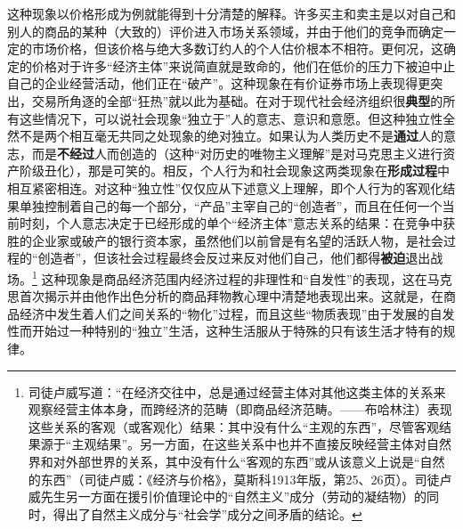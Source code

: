 \documentclass[fontset=fandol, a4paper, 12pt, openright]{ctexbook}
\begin{document}
这种现象以价格形成为例就能得到十分清楚的解释。许多买主和卖主是以对自己和别人的商品的某种（大致的）评价进入市场关系领域，并由于他们的竞争而确定一定的市场价格，但该价格与绝大多数订约人的个人估价根本不相符。更何况，这确定的价格对于许多“经济主体”来说简直就是致命的，他们在低价的压力下被迫中止自己的企业经营活动，他们正在“破产”。这种现象在有价证券市场上表现得更突出，交易所角逐的全部“狂热”就以此为基础。在对于现代社会经济组织很\textbf{典型}的所有这些情况下，可以说社会现象“独立于”人的意志、意识和意愿。但这种独立性全然不是两个相互毫无共同之处现象的绝对独立。如果认为人类历史不是\textbf{通过}人的意志，而是\textbf{不经过}人而创造的（这种“对历史的唯物主义理解”是对马克思主义进行资产阶级丑化），那是可笑的。相反，个人行为和社会现象这两类现象在\textbf{形成过程}中相互紧密相连。对这种“独立性”仅仅应从下述意义上理解，即个人行为的客观化结果单独控制着自己的每一个部分，“产品”主宰自己的“创造者”，而且在任何一个当前时刻，个人意志决定于已经形成的单个“经济主体”意志关系的结果：在竞争中获胜的企业家或破产的银行资本家，虽然他们以前曾是有名望的活跃人物，是社会过程的“创造者”，但该社会过程最终会反过来反对他们自己，他们都得\textbf{被迫}退出战场。\footnote{司徒卢威写道：“在经济交往中，总是通过经营主体对其他这类主体的关系来观察经营主体本身，而跨经济的范畴（即商品经济范畴。——布哈林注）表现这些关系的客观（或客观化）结果：其中没有什么“主观的东西”，尽管客观结果源于“主观结果”。另一方面，在这些关系中也并不直接反映经营主体对自然界和对外部世界的关系，其中没有什么“客观的东西”或从该意义上说是“自然的东西”（司徒卢威：《经济与价格》，莫斯科1913年版，第25、26页）。司徒卢威先生另一方面在援引价值理论中的“自然主义”成分（劳动的凝结物）的同时，得出了自然主义成分与“社会学”成分之间矛盾的结论。} 这种现象是商品经济范围内经济过程的非理性和“自发性”的表现，这在马克思首次揭示并由他作出色分析的商品拜物教心理中清楚地表现出来。这就是，在商品经济中发生着人们之间关系的“物化”过程，而且这些“物质表现”由于发展的自发性而开始过一种特别的“独立”生活，这种生活服从于特殊的只有该生活才特有的规律。
\end{document}
